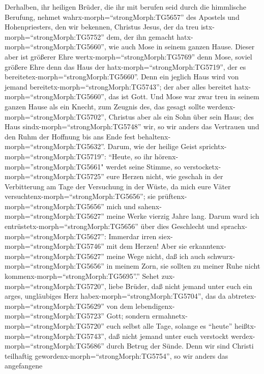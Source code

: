  Derhalben, ihr heiligen Brüder, die ihr mit berufen seid
durch die himmlische Berufung, nehmet wahrx-morph=``strongMorph:TG5657''
des Apostels und Hohenpriesters, den wir bekennen, Christus Jesus,
 der da treu istx-morph=``strongMorph:TG5752'' dem, der ihn
gemacht hatx-morph=``strongMorph:TG5660'', wie auch Mose in seinem
ganzen Hause.  Dieser aber ist größerer Ehre
wertx-morph=``strongMorph:TG5769'' denn Mose, soviel größere Ehre denn
das Haus der hatx-morph=``strongMorph:TG5719'', der es
bereitetex-morph=``strongMorph:TG5660''.  Denn ein jeglich
Haus wird von jemand bereitetx-morph=``strongMorph:TG5743''; der aber
alles bereitet hatx-morph=``strongMorph:TG5660'', das ist Gott.
 Und Mose war zwar treu in seinem ganzen Hause als ein
Knecht, zum Zeugnis des, das gesagt sollte
werdenx-morph=``strongMorph:TG5702'',  Christus aber als ein
Sohn über sein Haus; des Haus sindx-morph=``strongMorph:TG5748'' wir, so
wir anders das Vertrauen und den Ruhm der Hoffnung bis ans Ende fest
behaltenx-morph=``strongMorph:TG5632''.  Darum, wie der
heilige Geist sprichtx-morph=``strongMorph:TG5719'': ``Heute, so ihr
hörenx-morph=''strongMorph:TG5661" werdet seine Stimme,  so
verstocketx-morph=``strongMorph:TG5725'' eure Herzen nicht, wie geschah
in der Verbitterung am Tage der Versuchung in der Wüste,  da
mich eure Väter versuchtenx-morph=``strongMorph:TG5656''; sie
prüftenx-morph=``strongMorph:TG5656'' mich und
sahenx-morph=``strongMorph:TG5627'' meine Werke vierzig Jahre lang.
 Darum ward ich entrüstetx-morph=``strongMorph:TG5656''
über dies Geschlecht und sprachx-morph=``strongMorph:TG5627'': Immerdar
irren siex-morph=``strongMorph:TG5746'' mit dem Herzen! Aber sie
erkanntenx-morph=``strongMorph:TG5627'' meine Wege nicht, 
daß ich auch schwurx-morph=``strongMorph:TG5656'' in meinem Zorn, sie
sollten zu meiner Ruhe nicht kommenx-morph=``strongMorph:TG5695''.''
 Sehet zux-morph=``strongMorph:TG5720'', liebe Brüder, daß
nicht jemand unter euch ein arges, ungläubiges Herz
habex-morph=``strongMorph:TG5704'', das da
abtretex-morph=``strongMorph:TG5629'' von dem
lebendigenx-morph=``strongMorph:TG5723'' Gott;  sondern
ermahnetx-morph=``strongMorph:TG5720'' euch selbst alle Tage, solange es
``heute'' heißtx-morph=``strongMorph:TG5743'', daß nicht jemand unter
euch verstockt werdex-morph=``strongMorph:TG5686'' durch Betrug der
Sünde.  Denn wir sind Christi teilhaftig
gewordenx-morph=``strongMorph:TG5754'', so wir anders das angefangene
